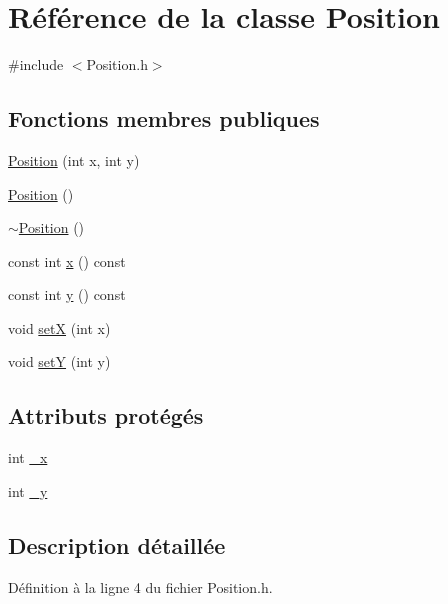 \hypertarget{a00014}{
\section{Référence de la classe Position}
\label{a00014}
}


{\ttfamily \#include $<$Position.h$>$}

\subsection*{Fonctions membres publiques}
\begin{DoxyCompactItemize}
\item 
\hyperlink{a00014_a6e36cf0fee251e74cfedb86f4e99558d}{Position} (int x, int y)
\item 
\hyperlink{a00014_a369a577425f8ba02e8750d04b6a088db}{Position} ()
\item 
\hyperlink{a00014_abe83df4cab7af756636b4e39e4378f4a}{$\sim$Position} ()
\item 
const int \hyperlink{a00014_a0841d002439a9ce95e6648743f40d304}{x} () const 
\item 
const int \hyperlink{a00014_a6aefe2530c6dbb86834ab51a6efbad4a}{y} () const 
\item 
void \hyperlink{a00014_ad46bb77324e2d9538e15f1a25320f1ff}{setX} (int x)
\item 
void \hyperlink{a00014_a473274f1a3e4888f9c5e3eba0889a1ab}{setY} (int y)
\end{DoxyCompactItemize}
\subsection*{Attributs protégés}
\begin{DoxyCompactItemize}
\item 
int \hyperlink{a00014_ab10abdd01f9b04e3060aba1b02c61d61}{\_\-x}
\item 
int \hyperlink{a00014_a3c32d185bedca060aa1a3c136f10e3d6}{\_\-y}
\end{DoxyCompactItemize}


\subsection{Description détaillée}


Définition à la ligne 4 du fichier Position.h.



